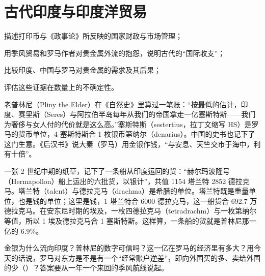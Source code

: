 \chapter{古代印度与印度洋贸易}\label{ch:india}

\begin{chapterguide}
\begin{guidegoals}
\item 描述打印币与《政事论》所反映的国家财政与市场管理；
\item 用季风贸易和罗马作者对贵金属外流的抱怨，说明古代的“国际收支”；
\item 比较印度、中国与罗马对贵金属的需求及其后果；
\item 评估这些证据在数量上的不确定性。
\end{guidegoals}
\end{chapterguide}

老普林尼（Pliny the Elder）在《自然史》里算过一笔账：“按最低的估计，印度、赛里斯（Seres）与阿拉伯半岛每年从我们的帝国拿走一亿塞斯特斯——我们为奢侈与女人付的代价就是这么高。”\cite{pliny}塞斯特斯（sestertius，拉丁文缩写 HS）是罗马的货币单位，4 塞斯特斯合 1 枚银币第纳尔（denarius）。中国的史书也记下了这门生意。《后汉书》说大秦（罗马）用金银作钱，“与安息、天竺交市于海中，利有十倍”\cite{houhanshu}。

一张 2 世纪中期的纸草，记下了一条船从印度运回的货：“赫尔玛波隆号（Hermapollon）船上运出的六批货，以银计”，共值 1154 塔兰特 2852 德拉克马\cite{casson1990}。塔兰特（talent）与德拉克马（drachma）是希腊的单位。塔兰特既是重量单位，也是钱的单位；这里是钱，1 塔兰特合 6000 德拉克马，这一船货合 692.7 万德拉克马。在安东尼时期的埃及，一枚四德拉克马（tetradrachm）与一枚第纳尔等值\cite{howgego2010}，所以 1 埃及德拉克马合 1 塞斯特斯。这样算，一条船的货就是普林尼那一亿的 6.9\%。

金银为什么流向印度？普林尼的数字可信吗？这一亿在罗马的经济里有多大？用今天的话说，罗马对东方是不是有一个“经常账户逆差”，即向外国买的多、卖给外国的少（）？答案要从一年一个来回的季风航线说起。

